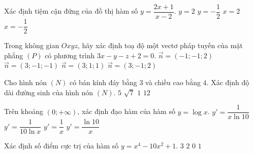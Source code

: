 \begin{ex}%
Xác định tiệm cận đứng của đồ thị hàm số $y=\dfrac{2x+1}{x-2}$.
\choice
{$y=2$}
{$y=-\dfrac{1}{2}$}
{\True $x=2$}
{$x=-\dfrac{1}{2}$}
\end{ex}
\begin{ex}%
	Trong không gian $Oxyz$, hãy xác định toạ độ một vectơ pháp tuyến của mặt phẳng $(P)$ có phương trình $3x-y-z+2=0$.
	\choice
	{$\vec{n}=(-1;-1;2)$}
	{\True $\vec{n}=(3;-1;-1)$}
	{$\vec{n}=(3;1;1)$}
	{$\vec{n}=(3;-1;2)$}
\end{ex}
\begin{ex}%
	Cho hình nón $(N)$ có bán kính đáy bằng $3$ và chiều cao bằng $4$. Xác định độ dài đường sinh của hình nón $(N)$.
	\choice
	{\True $5$}
	{$\sqrt{7}$}
	{$1$}
	{$12$}
\end{ex}
\begin{ex}%
	Trên khoảng $(0;+\infty)$, xác định đạo hàm của hàm số $y=\log x$.
	\choice
	{\True $y'=\dfrac{1}{x \ln 10}$}
	{$y'=\dfrac{1}{10 \ln x}$}
	{$y'=\dfrac{1}{x}$}
	{$y'=\dfrac{\ln 10}{x}$}
\end{ex}
\begin{ex}%
	Xác định số điểm cực trị của hàm số $y=x^4-10x^2+1$.
	\choice
	{\True $3$}
	{$2$}
	{$0$}
	{$1$}
\end{ex}
